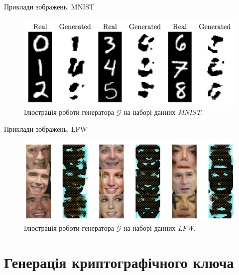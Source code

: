 \documentclass[xcolor={usenames,dvipsnames}]{beamer}
\begin{document}
    \begin{frame}{Приклади зображень. MNIST}
        \begin{figure}
        \centering
            \includegraphics[width=\textwidth]{images/mnist_demo.png}
            \caption{Ілюстрація роботи генератора $\mathcal{G}$ на наборі данних \textit{MNIST}.}
        \end{figure}
    \end{frame}

    \begin{frame}{Приклади зображень. LFW}
        \begin{figure}
        \centering
            \includegraphics[width=\textwidth]{images/lfw_demo.png}
            \caption{Ілюстрація роботи генератора $\mathcal{G}$ на наборі данних \textit{LFW}.}
        \end{figure}
    \end{frame}

    \section{Генерація криптографічного ключа}
\end{document}
